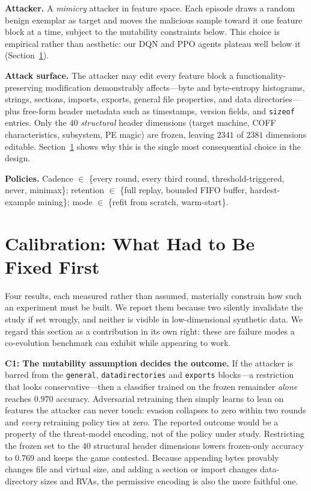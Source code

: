 \documentclass[conference]{IEEEtran}
\begin{document}
\textbf{Attacker.} A \emph{mimicry} attacker in feature space. Each episode
draws a random benign exemplar as target and moves the malicious sample toward
it one feature block at a time, subject to the mutability constraints below.
This choice is empirical rather than aesthetic: our DQN and PPO agents plateau
well below it (Section~\ref{sec:calibration}).

\textbf{Attack surface.} The attacker may edit every feature block a
functionality-preserving modification demonstrably affects---byte and
byte-entropy histograms, strings, sections, imports, exports, general file
properties, and data directories---plus free-form header metadata such as
timestamps, version fields, and \texttt{sizeof} entries. Only the $40$
\emph{structural} header dimensions (target machine, COFF characteristics,
subsystem, PE magic) are frozen, leaving $2341$ of $2381$ dimensions editable.
Section~\ref{sec:calibration} shows why this is the single most consequential
choice in the design.

\textbf{Policies.} Cadence $\in$ \{every round, every third round,
threshold-triggered, never, minimax\}; retention $\in$ \{full replay, bounded
FIFO buffer, hardest-example mining\}; mode $\in$ \{refit from scratch,
warm-start\}.

\section{Calibration: What Had to Be Fixed First}
\label{sec:calibration}

Four results, each measured rather than assumed, materially constrain how such
an experiment must be built. We report them because two silently invalidate the
study if set wrongly, and neither is visible in low-dimensional synthetic data.
We regard this section as a contribution in its own right: these are failure
modes a co-evolution benchmark can exhibit while appearing to work.

\textbf{C1: The mutability assumption decides the outcome.} If the attacker is
barred from the \texttt{general}, \texttt{datadirectories} and \texttt{exports}
blocks---a restriction that looks conservative---then a classifier trained on
the frozen remainder \emph{alone} reaches $0.970$ accuracy. Adversarial
retraining then simply learns to lean on features the attacker can never touch:
evasion collapses to zero within two rounds and \emph{every} retraining policy
ties at zero. The reported outcome would be a property of the threat-model
encoding, not of the policy under study. Restricting the frozen set to the $40$
structural header dimensions lowers frozen-only accuracy to $0.769$ and keeps
the game contested. Because appending bytes provably changes file and virtual
size, and adding a section or import changes data-directory sizes and RVAs, the
permissive encoding is also the more faithful one.
\end{document}
